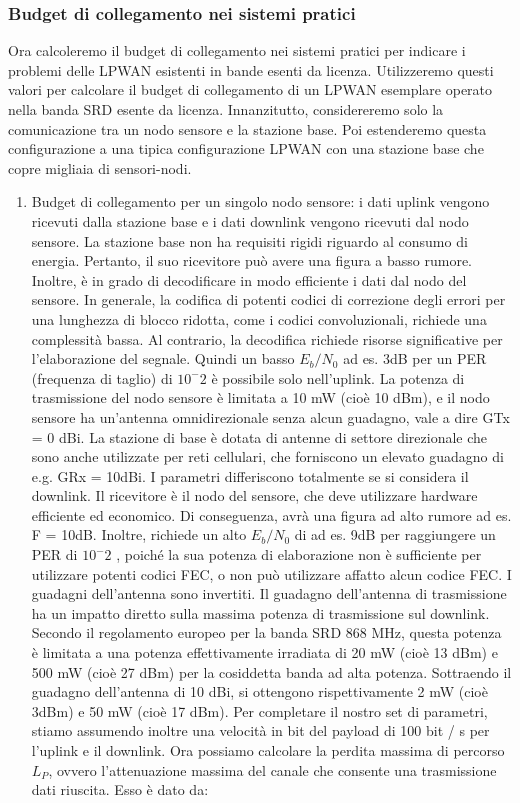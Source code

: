 \documentclass[a4paper]{report} %
\begin{document}
\subsubsection{Budget di collegamento nei sistemi pratici}
Ora calcoleremo il budget di collegamento nei sistemi pratici per indicare i problemi delle LPWAN esistenti in bande esenti da licenza. Utilizzeremo questi valori per calcolare il budget di collegamento di un LPWAN esemplare operato nella banda SRD esente da licenza. Innanzitutto, considereremo solo la comunicazione tra un nodo sensore e la stazione base. Poi estenderemo questa configurazione a una tipica configurazione LPWAN con una stazione base che copre migliaia di sensori-nodi. 
\begin{enumerate}
\item Budget di collegamento per un singolo nodo sensore: i dati uplink vengono ricevuti dalla stazione base e i dati downlink vengono ricevuti dal nodo sensore. La stazione base non ha requisiti rigidi riguardo al consumo di energia. Pertanto, il suo ricevitore può avere una figura a basso rumore. Inoltre, è in grado di decodificare in modo efficiente i dati dal nodo del sensore. In generale, la codifica di potenti codici di correzione degli errori per una lunghezza di blocco ridotta, come i codici convoluzionali, richiede una complessità bassa. Al contrario, la decodifica richiede risorse significative per l'elaborazione del segnale. Quindi un basso $E_{b} / N_{0}$ ad es. 3dB per un PER (frequenza di taglio) di $10^-2$ è possibile solo nell'uplink. La potenza di trasmissione del nodo sensore è limitata a 10 mW (cioè 10 dBm), e il nodo sensore ha un'antenna omnidirezionale senza alcun guadagno, vale a dire GTx = 0 dBi. La stazione di base è dotata di antenne di settore direzionale che sono anche utilizzate per reti cellulari, che forniscono un elevato guadagno di e.g. GRx = 10dBi. I parametri differiscono totalmente se si considera il downlink. Il ricevitore è il nodo del sensore, che deve utilizzare hardware efficiente ed economico. Di conseguenza, avrà una figura ad alto rumore ad es. F = 10dB. Inoltre, richiede un alto $E_{b} / N_{0}$  di ad es. 9dB per raggiungere un PER di $10^-2$ , poiché la sua potenza di elaborazione non è sufficiente per utilizzare potenti codici FEC, o non può utilizzare affatto alcun codice FEC. I guadagni dell'antenna sono invertiti. Il guadagno dell'antenna di trasmissione ha un impatto diretto sulla massima potenza di trasmissione sul downlink. Secondo il regolamento europeo per la banda SRD 868 MHz, questa potenza è limitata a una potenza effettivamente irradiata di 20 mW (cioè 13 dBm) e 500 mW (cioè 27 dBm) per la cosiddetta banda ad alta potenza. Sottraendo il guadagno dell'antenna di 10 dBi, si ottengono rispettivamente 2 mW (cioè 3dBm) e 50 mW (cioè 17 dBm). Per completare il nostro set di parametri, stiamo assumendo inoltre una velocità in bit del payload di 100 bit / s per l'uplink e il downlink. Ora possiamo calcolare la perdita massima di percorso $L_{P}$, ovvero l'attenuazione massima del canale che consente una trasmissione dati riuscita. Esso è dato da:

\end{enumerate}
\end{document}
